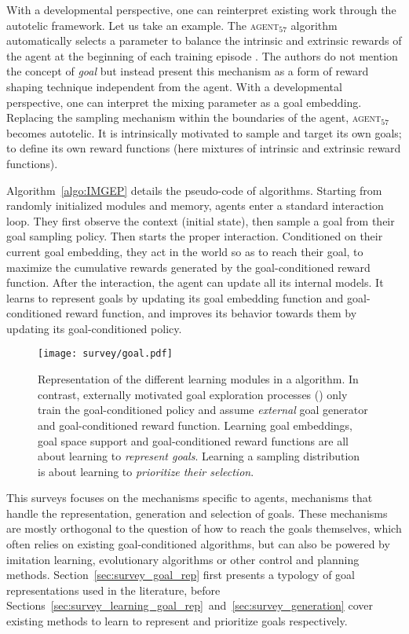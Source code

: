 With a developmental perspective, one can reinterpret existing work through the autotelic \rl framework. Let us take an example. The \textsc{agent$_{57}$} algorithm automatically selects a parameter to balance the intrinsic and extrinsic rewards of the agent at the beginning of each training episode \cite{badia2020agent57}. The authors do not mention the concept of \textit{goal} but instead present this mechanism as a form of reward shaping technique independent from the agent. With a developmental perspective, one can interpret the mixing parameter as a goal embedding. Replacing the sampling mechanism within the boundaries of the agent, \textsc{agent$_{57}$} becomes autotelic. It is intrinsically motivated to sample and target its own goals; \ie to define its own reward functions (here mixtures of intrinsic and extrinsic reward functions). 

Algorithm~\ref{algo:IMGEP} details the pseudo-code of \rlimgep algorithms. Starting from randomly initialized modules and memory, \rlimgep agents enter a standard \rl interaction loop. They first observe the context (initial state), then sample a goal from their goal sampling policy. Then starts the proper interaction. Conditioned on their current goal embedding, they act in the world so as to reach their goal, \ie to maximize the cumulative rewards generated by the goal-conditioned reward function. After the interaction, the agent can update all its internal models. It learns to represent goals by updating its goal embedding function and goal-conditioned reward function, and improves its behavior towards them by updating its goal-conditioned policy. 

\begin{figure}[h]
    \centering
    \texttt{[image: survey/goal.pdf]}
    \caption{Representation of the different learning modules in a \rlimgep algorithm. In contrast, externally     motivated goal exploration processes (\rlemgeps) only train the goal-conditioned policy and assume     \textit{external} goal generator and goal-conditioned reward function. Learning goal embeddings, goal space
    support and goal-conditioned reward functions are all about learning to \textit{represent goals}. Learning a
    sampling distribution is about learning to \textit{prioritize their selection}.}
    \label{fig:goal_directed_rl}
\end{figure}

This surveys focuses on the mechanisms specific to \rlimgep agents, \ie mechanisms that handle the representation, generation and selection of goals. These mechanisms are mostly orthogonal to the question of how to reach the goals themselves, which often relies on existing goal-conditioned algorithms, but can also be powered by imitation learning, evolutionary algorithms or other control and planning methods. Section~\ref{sec:survey_goal_rep} first presents a typology of goal representations used in the literature, before Sections~\ref{sec:survey_learning_goal_rep}~and~\ref{sec:survey_generation} cover existing methods to learn to represent and prioritize goals respectively. 




